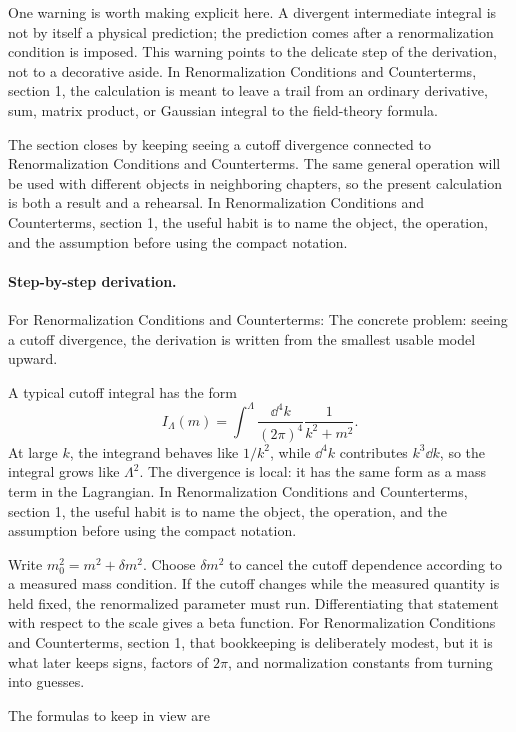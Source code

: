 One warning is worth making explicit here.  A divergent intermediate integral is not by itself a physical prediction; the prediction comes after a renormalization condition is imposed.  This warning points to the delicate step of the derivation, not to a decorative aside.  In Renormalization Conditions and Counterterms, section 1, the calculation is meant to leave a trail from an ordinary derivative, sum, matrix product, or Gaussian integral to the field-theory formula.

The section closes by keeping seeing a cutoff divergence connected to Renormalization Conditions and Counterterms.  The same general operation will be used with different objects in neighboring chapters, so the present calculation is both a result and a rehearsal.  In Renormalization Conditions and Counterterms, section 1, the useful habit is to name the object, the operation, and the assumption before using the compact notation.



\paragraph{Step-by-step derivation.}

For Renormalization Conditions and Counterterms: The concrete problem: seeing a cutoff divergence, the derivation is written from the smallest usable model upward.

A typical cutoff integral has the form
\[
  I_\Lambda(m)=\int^{\Lambda}\frac{\dd^4k}{(2\pi)^4}\frac{1}{k^2+m^2}.
\]
At large \(k\), the integrand behaves like \(1/k^2\), while \(\dd^4k\) contributes \(k^3\dd k\), so the integral grows like \(\Lambda^2\).  The divergence is local: it has the same form as a mass term in the Lagrangian.  In Renormalization Conditions and Counterterms, section 1, the useful habit is to name the object, the operation, and the assumption before using the compact notation.

Write \(m_0^2=m^2+\delta m^2\).  Choose \(\delta m^2\) to cancel the cutoff dependence according to a measured mass condition.  If the cutoff changes while the measured quantity is held fixed, the renormalized parameter must run.  Differentiating that statement with respect to the scale gives a beta function.  For Renormalization Conditions and Counterterms, section 1, that bookkeeping is deliberately modest, but it is what later keeps signs, factors of \(2\pi\), and normalization constants from turning into guesses.

The formulas to keep in view are

